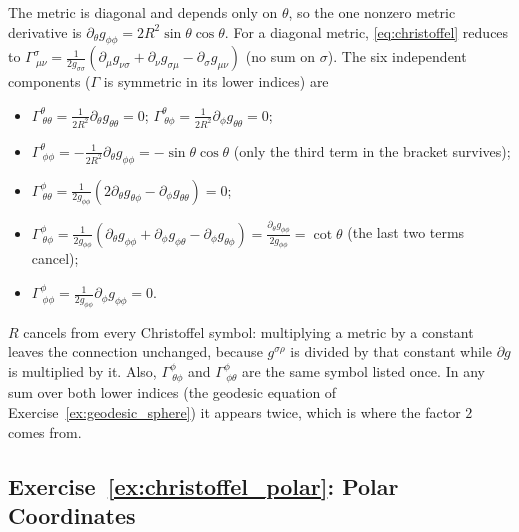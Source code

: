 \begin{derivation}
The metric is diagonal and depends only on $\theta$, so the one nonzero metric derivative is
$\partial_\theta g_{\phi\phi} = 2R^2\sin\theta\cos\theta$. For a diagonal metric,
\eqref{eq:christoffel} reduces to
$\Gamma^\sigma_{\ \mu\nu} = \frac{1}{2g_{\sigma\sigma}}
(\partial_\mu g_{\nu\sigma} + \partial_\nu g_{\sigma\mu} - \partial_\sigma g_{\mu\nu})$
(no sum on $\sigma$). The six independent components ($\Gamma$ is symmetric in its
lower indices) are
\begin{itemize}
    \item $\Gamma^\theta_{\ \theta\theta} = \frac{1}{2R^2}\partial_\theta g_{\theta\theta} = 0$;
          \quad $\Gamma^\theta_{\ \theta\phi} = \frac{1}{2R^2}\partial_\phi g_{\theta\theta} = 0$;
    \item $\Gamma^\theta_{\ \phi\phi} = -\frac{1}{2R^2}\partial_\theta g_{\phi\phi} = -\sin\theta\cos\theta$
          (only the third term in the bracket survives);
    \item $\Gamma^\phi_{\ \theta\theta} = \frac{1}{2g_{\phi\phi}}(2\partial_\theta g_{\theta\phi} - \partial_\phi g_{\theta\theta}) = 0$;
    \item $\Gamma^\phi_{\ \theta\phi} = \frac{1}{2g_{\phi\phi}}(\partial_\theta g_{\phi\phi} + \partial_\phi g_{\phi\theta} - \partial_\phi g_{\theta\phi})
          = \frac{\partial_\theta g_{\phi\phi}}{2g_{\phi\phi}} = \cot\theta$
          (the last two terms cancel);
    \item $\Gamma^\phi_{\ \phi\phi} = \frac{1}{2g_{\phi\phi}}\partial_\phi g_{\phi\phi} = 0$.
\end{itemize}
\end{derivation}

\begin{annotation}
$R$ cancels from every Christoffel symbol: multiplying a metric by a constant leaves the
connection unchanged, because $g^{\sigma\rho}$ is divided by that constant while
$\partial g$ is multiplied by it. Also, $\Gamma^\phi_{\ \theta\phi}$ and
$\Gamma^\phi_{\ \phi\theta}$ are the same symbol listed once. In any sum over both lower
indices (the geodesic equation of Exercise~\ref{ex:geodesic_sphere}) it appears twice, which
is where the factor $2$ comes from.
\end{annotation}

\subsection*{Exercise~\ref{ex:christoffel_polar}: Polar Coordinates}

